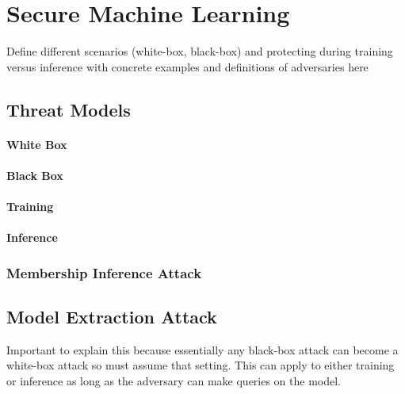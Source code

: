\thispagestyle{myheadings}

\graphicspath{{2_Body/Figures/}}

\section{Secure Machine Learning}
Define different scenarios (white-box, black-box) and protecting during training versus inference with concrete examples and definitions of adversaries here

\subsection{Threat Models}
\cite{abadi2017protection}
\paragraph{White Box}
\paragraph{Black Box}
\paragraph{Training}
\paragraph{Inference}

\subsubsection{Membership Inference Attack}

\subsection{Model Extraction Attack}
Important to explain this because essentially any black-box attack can become a white-box attack so must assume that setting. This can apply to either training or inference as long as the adversary can make queries on the model.

